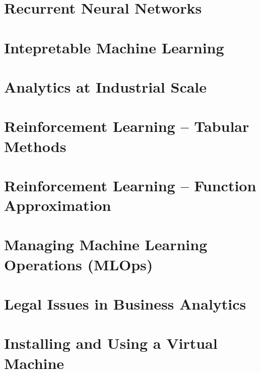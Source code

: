 \documentclass{book}
\begin{document}
\graphicspath{{class17/}}
\chapter{Recurrent Neural Networks}


\graphicspath{{class19/}}
\chapter{Intepretable Machine Learning}


\graphicspath{{class20/}}
\chapter{Analytics at Industrial Scale}


\graphicspath{{class21/}}
\chapter{Reinforcement Learning -- Tabular Methods}


\graphicspath{{class22/}}
\chapter{Reinforcement Learning -- Function Approximation}


\graphicspath{{class23/}}
\chapter{Managing Machine Learning Operations (MLOps)}


\graphicspath{{class24/}}
\chapter{Legal Issues in Business Analytics}


\appendix
\graphicspath{{vm/}}
\chapter{Installing and Using a Virtual Machine}


\backmatter

%

\printindex
\end{document}

